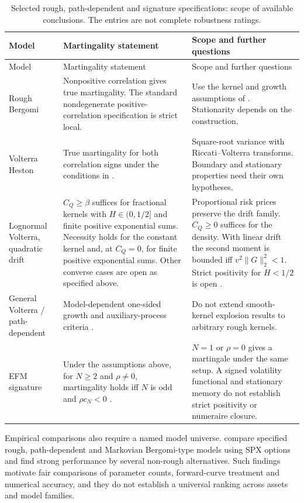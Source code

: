 \documentclass[11pt,a4paper]{article}
\theoremstyle{definition}
\theoremstyle{remark}
\begin{document}
{\small
\setlength{\tabcolsep}{4pt}
\renewcommand{\arraystretch}{1.2}
\begin{longtable}{@{}P{32mm}P{60mm}P{53mm}@{}}
\caption{Selected rough, path-dependent and signature specifications: scope of available conclusions. The entries are not complete robustness ratings.}\label{tab:nonmarkov}\\
\toprule Model & Martingality statement & Scope and further questions\\ \midrule
\endfirsthead
\toprule Model & Martingality statement & Scope and further questions\\ \midrule
\endhead
\bottomrule
\endfoot
Rough Bergomi & Nonpositive correlation gives true martingality. The standard nondegenerate positive-correlation specification is strict local. & Use the kernel and growth assumptions of \citet{Gassiat2019}. Stationarity depends on the construction.\\
Volterra Heston & True martingality for both correlation signs under the conditions in \citet{AbiJaberLarssonPulido2019}. & Square-root variance with Riccati--Volterra transforms. Boundary and stationary properties need their own hypotheses.\\
Lognormal Volterra, quadratic drift & $C_Q\geq\beta$ suffices for fractional kernels with $H\in(0,1/2]$ and finite positive exponential sums. Necessity holds for the constant kernel and, at $C_Q=0$, for finite positive exponential sums. Other converse cases are open as specified above. & Proportional risk prices preserve the drift family. $C_Q\geq0$ suffices for the density. With linear drift the second moment is bounded iff $v^2\|G\|_2^2<1$. Strict positivity for $H<1/2$ is open \citep{SeppRakhmonovRoughLogSV2026}.\\
General Volterra / path-dependent & Model-dependent one-sided growth and auxiliary-process criteria \citep{GuyonJeanninJourdain2026}. & Do not extend smooth-kernel explosion results to arbitrary rough kernels.\\
EFM signature & Under the assumptions above, for \(N\geq2\) and \(\rho\neq0\), martingality holds iff \(N\) is odd and \(\rho c_N<0\) \citep[Theorem~3.3]{SotnikovViot2026}. & \(N=1\) or \(\rho=0\) gives a martingale under the same setup. A signed volatility functional and stationary memory do not establish strict positivity or numeraire closure.\\
\end{longtable}
}

Empirical comparisons also require a named model universe. \citet{AbiJaberLi2025} compare specified rough, path-dependent and Markovian Bergomi-type models using SPX options and find strong performance by several non-rough alternatives. Such findings motivate fair comparisons of parameter counts, forward-curve treatment and numerical accuracy, and they do not establish a universal ranking across assets and model families.
\end{document}
